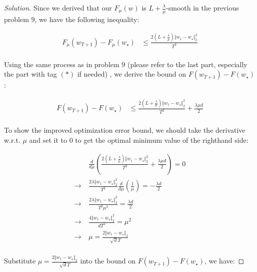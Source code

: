 \documentclass{article}
\newenvironment{solution}
  {\renewcommand\qedsymbol{$\blacksquare$}\begin{proof}[Solution]}
  {\end{proof}}
\begin{document}
\begin{solution}
    Since we derived that our $F_\mu(w)$ is $L + \frac{\lambda}{\mu}$-smooth in the previous problem $9$, 
    we have the following inequality:

    \begin{align*}
        F_\mu(w_{T+1}) - F_\mu(w_\star) 
        &\leq \frac{ 2 \left(L + \frac{\lambda}{\mu}\right) \Vert w_1 - w_\star \Vert^2_2}{T^2} \\
    \end{align*}

    Using the same process as in problem $9$ 
    (please refer to the last part, especially the part with tag $(*)$ if needed)
    , we derive the bound on $F(w_{T+1}) - F(w_\star)$:

    \begin{align*}
        F(w_{T+1}) - F(w_\star) 
        &\leq \frac{ 2 \left(L + \frac{\lambda}{\mu}\right) \Vert w_1 - w_\star \Vert^2_2}{T^2} + \frac{\lambda \mu d}{2} \\
    \end{align*}

    To show the improved optimization error bound, 
    we should take the derivative w.r.t. $\mu$ and set it to $0$ to get the optimal minimum value of the righthand side:

    \begin{align*}
        &\frac{d}{d\mu} \left( \frac{ 2 \left(L + \frac{\lambda}{\mu}\right) \Vert w_1 - w_\star \Vert^2_2}{T^2} + \frac{\lambda \mu d}{2} \right) = 0 \\
        \rightarrow \ & \frac{2 \lambda \Vert w_1 - w_\star \Vert^2_2}{T^2} \frac{d}{d\mu} \left( \frac{1}{\mu} \right) = - \frac{\lambda d}{2} \\
        \rightarrow \ & \frac{2 \lambda \Vert w_1 - w_\star \Vert^2_2}{T^2 \mu^2} = \frac{\lambda d}{2} \\
        \rightarrow \ & \frac{4 \Vert w_1 - w_\star \Vert^2_2}{d T^2 } = \mu^2 \\
        \rightarrow \ & \mu = \frac{2 \Vert w_1 - w_\star \Vert_2}{\sqrt{d} T} \\
    \end{align*}

    Substitute $\mu = \frac{2 \Vert w_1 - w_\star \Vert_2}{\sqrt{d} T}$ into the bound on $F(w_{T+1}) - F(w_\star)$, we have:


\end{solution}
\end{document}
